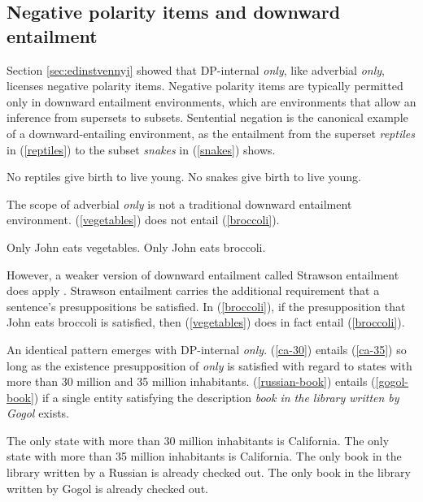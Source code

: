 \subsection{Negative polarity items and downward entailment}
Section \ref{sec:edinstvennyj} showed that DP-internal \textit{only}, like adverbial \textit{only}, licenses negative polarity items. Negative polarity items are typically permitted only in downward entailment environments, which are environments that allow an inference from supersets to subsets. Sentential negation is the canonical example of a downward-entailing environment, as the entailment from the superset \textit{reptiles} in (\ref{reptiles}) to the subset \textit{snakes} in (\ref{snakes}) shows.

\begin{exe}
	\ex \label{reptiles} No reptiles give birth to live young.
	\ex \label{snakes} No snakes give birth to live young.
\end{exe}

The scope of adverbial \textit{only} is not a traditional downward entailment environment. (\ref{vegetables}) does not entail (\ref{broccoli}).

\begin{exe}
	\ex \label{vegetables} Only John eats vegetables.
	\ex \label{broccoli} Only John eats broccoli.
\end{exe}

However, a weaker version of downward entailment called Strawson entailment does apply \citep{fintel99}. Strawson entailment carries the additional requirement that a sentence's presuppositions be satisfied. In (\ref{broccoli}), if the presupposition that John eats broccoli is satisfied, then (\ref{vegetables}) does in fact entail (\ref{broccoli}).

An identical pattern emerges with DP-internal \textit{only}. (\ref{ca-30}) entails (\ref{ca-35}) so long as the existence presupposition of \textit{only} is satisfied with regard to states with more than 30 million and 35 million inhabitants. (\ref{russian-book}) entails (\ref{gogol-book}) if a single entity satisfying the description \textit{book in the library written by Gogol} exists.

\begin{exe}
	\ex \label{ca-30} The only state with more than 30 million inhabitants is California.
	\ex \label{ca-35} The only state with more than 35 million inhabitants is California.
	\ex \label{russian-book} The only book in the library written by a Russian is already checked out.
	\ex \label{gogol-book} The only book in the library written by Gogol is already checked out.
\end{exe}

